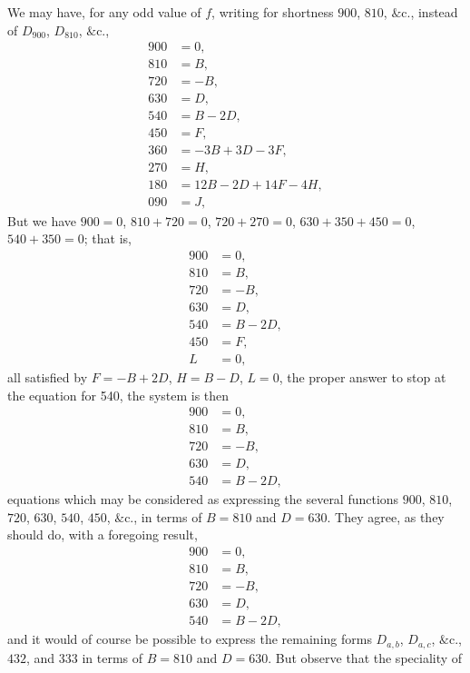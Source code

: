 \documentclass[12pt,a4paper]{article}
\theoremstyle{definition}
\begin{document}
\bigskip

\noindent We may have, for any odd value of $f$, writing for shortness $900$, $810$, $\&\text{c.}$, instead of $D_{900}$, $D_{810}$, $\&\text{c.}$,
\begin{align*}
900 &= 0, \\
810 &= B, \\
720 &= -B, \\
630 &= D, \\
540 &= B - 2D, \\
450 &= F, \\
360 &= -3B + 3D - 3F, \\
270 &= H, \\
180 &= 12B - 2D + 14F - 4H, \\
090 &= J,
\end{align*}
But we have $900 = 0$, $810 + 720 = 0$, $720 + 270 = 0$, $630 + 350 + 450 = 0$, $540 + 350 = 0$;
that is,
\begin{align*}
900 &= 0, \\
810 &= B, \\
720 &= -B, \\
630 &= D, \\
540 &= B - 2D, \\
450 &= F, \\
L &= 0,
\end{align*}
all satisfied by $F = -B + 2D$, $H = B - D$, $L = 0$, the proper answer to stop at the equation for 540, the system is then
\begin{align*}
900 &= 0, \\
810 &= B, \\
720 &= -B, \\
630 &= D, \\
540 &= B - 2D,
\end{align*}
equations which may be considered as expressing the several functions $900$, $810$, $720$, $630$, $540$, $450$, $\&\text{c.}$, in terms of $B = 810$ and $D = 630$. They agree, as they should do, with a foregoing result,
\begin{align*}
900 &= 0, \\
810 &= B, \\
720 &= -B, \\
630 &= D, \\
540 &= B - 2D,
\end{align*}
and it would of course be possible to express the remaining forms $D_{a,b}$, $D_{a,c}$, $\&\text{c.}$, $432$, and $333$ in terms of $B = 810$ and $D = 630$. But observe that the speciality of
\end{document}
